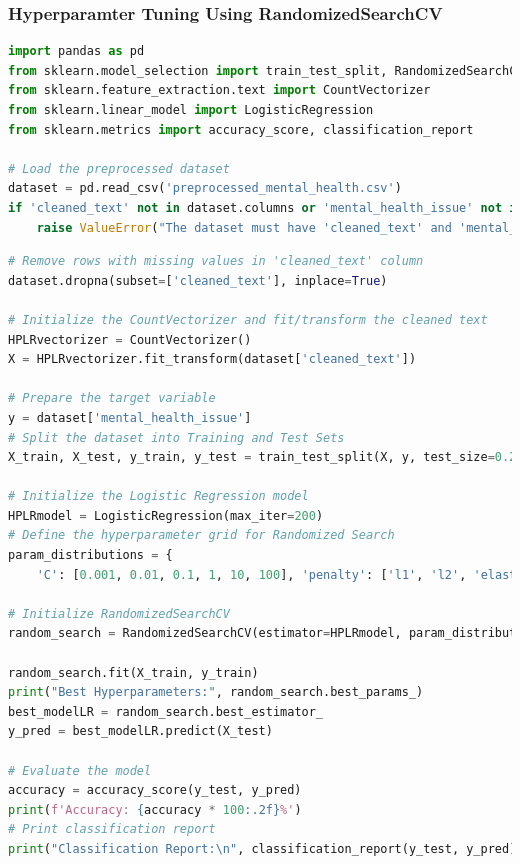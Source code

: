 
\subsubsection{Hyperparamter Tuning Using RandomizedSearchCV}

\begin{tcolorbox}[colback=gray!5!white, colframe=gray!80!black, boxrule=0.5pt, title=Logistic Regression]
\begin{lstlisting}[language=Python]
import pandas as pd
from sklearn.model_selection import train_test_split, RandomizedSearchCV
from sklearn.feature_extraction.text import CountVectorizer
from sklearn.linear_model import LogisticRegression
from sklearn.metrics import accuracy_score, classification_report

# Load the preprocessed dataset
dataset = pd.read_csv('preprocessed_mental_health.csv')
if 'cleaned_text' not in dataset.columns or 'mental_health_issue' not in dataset.columns:
    raise ValueError("The dataset must have 'cleaned_text' and 'mental_health_issue' columns.")
\end{lstlisting}
\end{tcolorbox}

\begin{tcolorbox}[colback=gray!5!white, colframe=gray!80!black, boxrule=0.5pt, title=Logistic Regression]
    \begin{lstlisting}[language=Python]
# Remove rows with missing values in 'cleaned_text' column
dataset.dropna(subset=['cleaned_text'], inplace=True)

# Initialize the CountVectorizer and fit/transform the cleaned text
HPLRvectorizer = CountVectorizer()
X = HPLRvectorizer.fit_transform(dataset['cleaned_text'])

# Prepare the target variable
y = dataset['mental_health_issue']
# Split the dataset into Training and Test Sets
X_train, X_test, y_train, y_test = train_test_split(X, y, test_size=0.2, random_state=42)

# Initialize the Logistic Regression model
HPLRmodel = LogisticRegression(max_iter=200)
# Define the hyperparameter grid for Randomized Search
param_distributions = {
    'C': [0.001, 0.01, 0.1, 1, 10, 100], 'penalty': ['l1', 'l2', 'elasticnet', 'none'], 'solver': ['liblinear', 'saga']}

# Initialize RandomizedSearchCV
random_search = RandomizedSearchCV(estimator=HPLRmodel, param_distributions=param_distributions, n_iter=10, scoring='accuracy', cv=5, n_jobs=-1, random_state=42)

random_search.fit(X_train, y_train)
print("Best Hyperparameters:", random_search.best_params_)
best_modelLR = random_search.best_estimator_
y_pred = best_modelLR.predict(X_test)

# Evaluate the model
accuracy = accuracy_score(y_test, y_pred)
print(f'Accuracy: {accuracy * 100:.2f}%')
# Print classification report
print("Classification Report:\n", classification_report(y_test, y_pred))
\end{lstlisting}
\end{tcolorbox}

